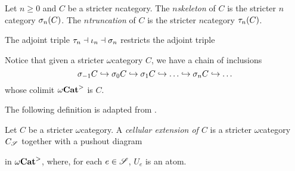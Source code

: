 \begin{dfn}
    Let \( n \geq 0 \) and \( C \) be a stricter \( n \)\nbd category.
    The \emph{\( n \)\nbd skeleton} of \( C \) is the stricter \( n \)\nbd category \( \sigma_{n}(C) \).
    The \emph{\( n \)\nbd truncation} of \( C \) is the stricter \( n \)\nbd category \( \tau_{n}(C) \).
\end{dfn}

\noindent The adjoint triple \( \tau_{n} \dashv \iota_n \dashv \sigma_{n} \) restricts the adjoint triple
\begin{center}
\end{center}
Notice that given a stricter \( \omega \)\nbd category \( C \), we have a chain of inclusions 
\begin{equation*}
    \sigma_{-1} C \hookrightarrow \sigma_{0} C \hookrightarrow \sigma_{1} C \hookrightarrow \ldots \hookrightarrow \sigma_{n} C \hookrightarrow \ldots
\end{equation*}
whose colimit \( {\omega\mathbf{Cat}}^> \) is \( C \).

The following definition is adapted from \cite[8.2.1]{hadzihasanovic2024combinatorics}.
\begin{dfn}  \label{dfn:cellular_extension}
    Let \( C \) be a stricter \( \omega \)\nbd category.
    A \emph{cellular extension of \( C \)} is a stricter \( \omega \)\nbd category \( C_{\mathscr{S}} \) together with a pushout diagram 
    \begin{center}
    \end{center}
    in \( {\omega\mathbf{Cat}}^> \), where, for each \( e \in \mathscr{S} \), \( U_e \) is an atom.
\end{dfn}

